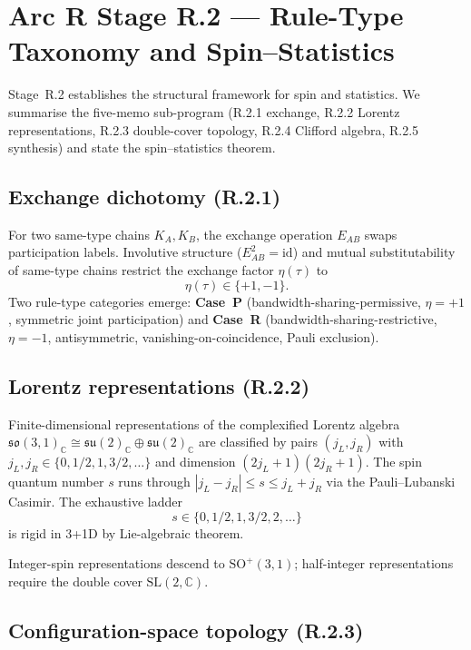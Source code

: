\documentclass[11pt,a4paper]{article}
\begin{document}
\section{Arc R Stage R.2 --- Rule-Type Taxonomy and Spin--Statistics}
\label{sec:r2}

Stage~R.2 establishes the structural framework for spin and statistics. We summarise the five-memo sub-program (R.2.1 exchange, R.2.2 Lorentz representations, R.2.3 double-cover topology, R.2.4 Clifford algebra, R.2.5 synthesis) and state the spin--statistics theorem.

\subsection{Exchange dichotomy (R.2.1)}

For two same-type chains $K_A, K_B$, the exchange operation $E_{AB}$ swaps participation labels. Involutive structure ($E_{AB}^2 = \mathrm{id}$) and mutual substitutability of same-type chains restrict the exchange factor $\eta(\tau)$ to
\begin{equation}
\eta(\tau) \in \{+1, -1\}.
\end{equation}
Two rule-type categories emerge: \textbf{Case~P} (bandwidth-sharing-permissive, $\eta = +1$, symmetric joint participation) and \textbf{Case~R} (bandwidth-sharing-restrictive, $\eta = -1$, antisymmetric, vanishing-on-coincidence, Pauli exclusion).

\subsection{Lorentz representations (R.2.2)}

Finite-dimensional representations of the complexified Lorentz algebra $\mathfrak{so}(3,1)_\mathbb{C} \cong \mathfrak{su}(2)_\mathbb{C} \oplus \mathfrak{su}(2)_\mathbb{C}$ are classified by pairs $(j_L, j_R)$ with $j_L, j_R \in \{0, 1/2, 1, 3/2, \dots\}$ and dimension $(2j_L + 1)(2j_R + 1)$. The spin quantum number $s$ runs through $|j_L - j_R| \le s \le j_L + j_R$ via the Pauli--Lubanski Casimir. The exhaustive ladder
\begin{equation}
s \in \{0, 1/2, 1, 3/2, 2, \dots\}
\end{equation}
is rigid in 3+1D by Lie-algebraic theorem.

Integer-spin representations descend to $\mathrm{SO}^+(3,1)$; half-integer representations require the double cover $\mathrm{SL}(2,\mathbb{C})$.

\subsection{Configuration-space topology (R.2.3)}
\end{document}
